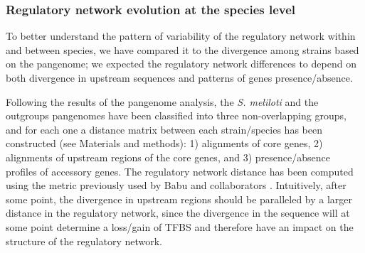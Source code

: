 \subsubsection{Regulatory network evolution at the species level}
To better understand the pattern of variability of the regulatory network within and between species, we have compared it to the divergence among strains based on the pangenome; we expected the regulatory network differences to depend on both divergence in upstream sequences and patterns of genes presence/absence. 

Following the results of the pangenome analysis, the \emph{S. meliloti} and the outgroups pangenomes have been classified into three non-overlapping groups, and for each one a distance matrix between each strain/species has been constructed (see Materials and methods): 1) alignments of core genes, 2) alignments of upstream regions of the core genes, and 3) presence/absence profiles of accessory genes.
 The regulatory network distance has been computed using the metric previously used by Babu and collaborators \cite{babu2006evolutionary}.
 Intuitively, after some point, the divergence in upstream regions should be paralleled by a larger distance in the regulatory network, since the divergence in the sequence will at some point determine a loss/gain of TFBS and therefore have an impact on the structure of the regulatory network.


